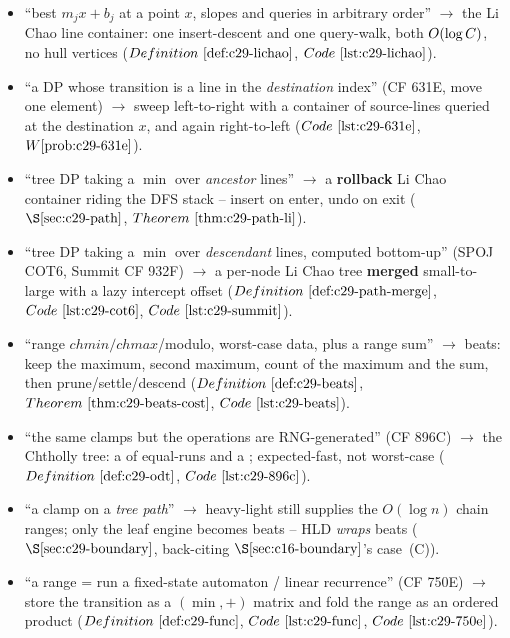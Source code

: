 \begin{itemize}[nosep, leftmargin=1.4em]
  \item ``best \(m_j x + b_j\) at a point \(x\), slopes and queries in arbitrary order'' \(\to\) the
        Li Chao line container: one insert-descent and one query-walk, both \(O(\log C)\), no hull
        vertices (\(\defref{c29-lichao}\), \(\coderef{c29-lichao}\)).
  \item ``a DP whose transition is a line in the \emph{destination} index'' (CF 631E, move one
        element) \(\to\) sweep left-to-right with a container of source-lines queried at the
        destination \(x\), and again right-to-left (\(\coderef{c29-631e}\), \(\probref{c29-631e}\)).
  \item ``tree DP taking a \(\min\) over \emph{ancestor} lines'' \(\to\) a \textbf{rollback} Li Chao
        container riding the DFS stack -- insert on enter, undo on exit
        (\(\secref{c29-path}\), \(\thmref{c29-path-li}\)).
  \item ``tree DP taking a \(\min\) over \emph{descendant} lines, computed bottom-up'' (SPOJ COT6,
        Summit CF 932F) \(\to\) a per-node Li Chao tree \textbf{merged} small-to-large with a lazy
        intercept offset (\(\defref{c29-path-merge}\), \(\coderef{c29-cot6}\), \(\coderef{c29-summit}\)).
  \item ``range \(\mathit{chmin}/\mathit{chmax}\)/modulo, worst-case data, plus a range sum'' \(\to\)
        beats: keep the maximum, second maximum, count of the maximum and the sum, then
        prune/settle/descend
        (\(\defref{c29-beats}\), \(\thmref{c29-beats-cost}\), \(\coderef{c29-beats}\)).
  \item ``the same clamps but the operations are RNG-generated'' (CF 896C) \(\to\) the Chtholly tree:
        a  of equal-runs and a ; expected-fast, not worst-case
        (\(\defref{c29-odt}\), \(\coderef{c29-896c}\)).
  \item ``a clamp on a \emph{tree path}'' \(\to\) heavy-light still supplies the \(O(\log n)\) chain
        ranges; only the leaf engine becomes beats -- HLD \emph{wraps} beats
        (\(\secref{c29-boundary}\), back-citing \(\secref{c16-boundary}\)'s case~(C)).
  \item ``a range = run a fixed-state automaton / linear recurrence'' (CF 750E) \(\to\) store the
        transition as a \((\min,+)\) matrix and fold the range as an ordered product
        (\(\defref{c29-func}\), \(\coderef{c29-func}\), \(\coderef{c29-750e}\)).
\end{itemize}

